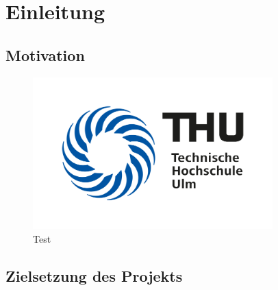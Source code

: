 \section{Einleitung}

\subsection{Motivation}
\begin{figure}[H]
    \centering
    \includegraphics[width=350]{data/thu_logo.png}
    \caption{Test}
    \label{fig:ips}
\end{figure}

\subsection{Zielsetzung des Projekts}
\newpage